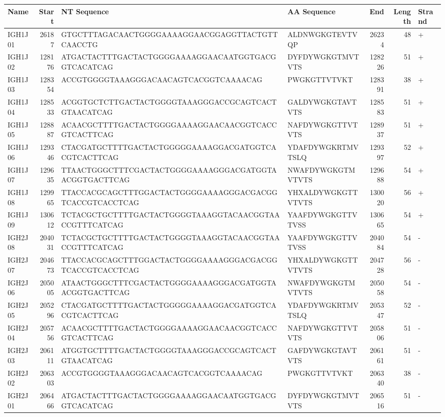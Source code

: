 \begin{tabular}{lrllrrl}
  \toprule Name & Start & NT Sequence & AA Sequence & End & Length & Strand \\ 
  \midrule IGH1J01 & 26187 & GTGCTTTAGACAACTGGGGAAAAGGAACGGAGGTTACTGTTCAACCTG & ALDNWGKGTEVTVQP & 26234 & 48 & + \\ 
  IGH1J02 & 128176 & ATGACTACTTTGACTACTGGGGAAAAGGAACAATGGTGACGGTCACATCAG & DYFDYWGKGTMVTVTS & 128226 & 51 & + \\ 
  IGH1J03 & 128354 & ACCGTGGGGTAAAGGGACAACAGTCACGGTCAAAACAG & PWGKGTTVTVKT & 128391 & 38 & + \\ 
  IGH1J04 & 128533 & ACGGTGCTCTTGACTACTGGGGTAAAGGGACCGCAGTCACTGTAACATCAG & GALDYWGKGTAVTVTS & 128583 & 51 & + \\ 
  IGH1J05 & 128887 & ACAACGCTTTTGACTACTGGGGAAAAGGAACAACGGTCACCGTCACTTCAG & NAFDYWGKGTTVTVTS & 128937 & 51 & + \\ 
  IGH1J06 & 129346 & CTACGATGCTTTTGACTACTGGGGGAAAAGGACGATGGTCACGTCACTTCAG & YDAFDYWGKRTMVTSLQ & 129397 & 52 & + \\ 
  IGH1J07 & 129635 & TTAACTGGGCTTTCGACTACTGGGGAAAAGGGACGATGGTAACGGTGACTTCAG & NWAFDYWGKGTMVTVTS & 129688 & 54 & + \\ 
  IGH1J08 & 129965 & TTACCACGCAGCTTTGGACTACTGGGGAAAAGGGACGACGGTCACCGTCACCTCAG & YHXALDYWGKGTTVTVTS & 130020 & 56 & + \\ 
  IGH1J09 & 130612 & TCTACGCTGCTTTTGACTACTGGGGTAAAGGTACAACGGTAACCGTTTCATCAG & YAAFDYWGKGTTVTVSS & 130665 & 54 & + \\ 
  IGH2J08 & 204031 & TCTACGCTGCTTTTGACTACTGGGGTAAAGGTACAACGGTAACCGTTTCATCAG & YAAFDYWGKGTTVTVSS & 204084 & 54 & - \\ 
  IGH2J07 & 204673 & TTACCACGCAGCTTTGGACTACTGGGGAAAAGGGACGACGGTCACCGTCACCTCAG & YHXALDYWGKGTTVTVTS & 204728 & 56 & - \\ 
  IGH2J06 & 205005 & ATAACTGGGCTTTCGACTACTGGGGAAAAGGGACGATGGTAACGGTGACTTCAG & NWAFDYWGKGTMVTVTS & 205058 & 54 & - \\ 
  IGH2J05 & 205296 & CTACGATGCTTTTGACTACTGGGGGAAAAGGACGATGGTCACGTCACTTCAG & YDAFDYWGKRTMVTSLQ & 205347 & 52 & - \\ 
  IGH2J04 & 205756 & ACAACGCTTTTGACTACTGGGGAAAAGGAACAACGGTCACCGTCACTTCAG & NAFDYWGKGTTVTVTS & 205806 & 51 & - \\ 
  IGH2J03 & 206111 & ATGGTGCTTTTGACTACTGGGGTAAAGGGACCGCAGTCACTGTAACATCAG & GAFDYWGKGTAVTVTS & 206161 & 51 & - \\ 
  IGH2J02 & 206303 & ACCGTGGGGTAAAGGGACAACAGTCACGGTCAAAACAG & PWGKGTTVTVKT & 206340 & 38 & - \\ 
  IGH2J01 & 206466 & ATGACTACTTTGACTACTGGGGAAAAGGAACAATGGTGACGGTCACATCAG & DYFDYWGKGTMVTVTS & 206516 & 51 & - \\ 
   \bottomrule \end{tabular}
